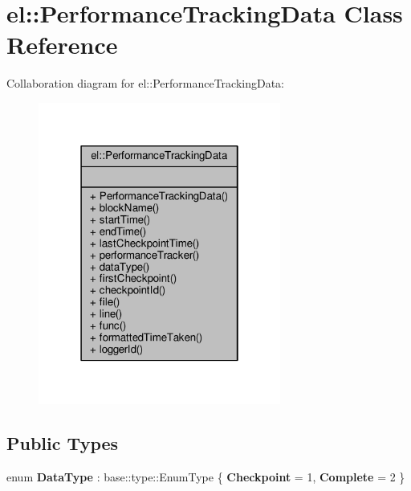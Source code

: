 \hypertarget{classel_1_1PerformanceTrackingData}{}\section{el\+:\+:Performance\+Tracking\+Data Class Reference}
\label{classel_1_1PerformanceTrackingData}


Collaboration diagram for el\+:\+:Performance\+Tracking\+Data\+:
\nopagebreak
\begin{figure}[H]
\begin{center}
\leavevmode
\includegraphics[width=226pt]{de/d79/classel_1_1PerformanceTrackingData__coll__graph}
\end{center}
\end{figure}
\subsection*{Public Types}
\begin{DoxyCompactItemize}
\item 
enum {\bfseries Data\+Type} \+: base\+::type\+::\+Enum\+Type \{ {\bfseries Checkpoint} = 1, 
{\bfseries Complete} = 2
 \}\hypertarget{classel_1_1PerformanceTrackingData_a1b45d5b1d5e76d0687aaffcf08302f17}{}\label{classel_1_1PerformanceTrackingData_a1b45d5b1d5e76d0687aaffcf08302f17}

\end{DoxyCompactItemize}

